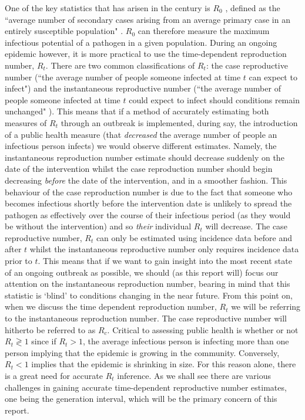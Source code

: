 \documentclass[10pt,journal,compsoc]{IEEEtran}
\begin{document}
One of the key statistics that has arisen in the  century is $R_0$ \cite{Heesterbeek}, defined as the ``average number of secondary cases arising from an average primary case in an entirely susceptible population" \cite{Keeling-Rohani}. $R_0$ can therefore measure the maximum infectious potential of a pathogen in a given population. During an ongoing epidemic however, it is more practical to use the time-dependent reproduction number, $R_t$. There are two common classifications of $R_t$: the case reproductive number (``the average number of people someone infected at time $t$ can expect to infect") and the instantaneous reproductive number (``the average number of people someone infected at time $t$ could expect to infect should conditions remain unchanged" \cite{Fraser}). This means that if a method of accurately estimating both measures of $R_t$ through an outbreak is implemented, during say, the introduction of a public health measure (that \textit{decreased} the average number of people an infectious person infects) we would observe different estimates. Namely, the instantaneous reproduction number estimate should decrease suddenly on the date of the intervention whilst the case reproduction number should begin decreasing \textit{before} the date of the intervention, and in a smoother fashion. This behaviour of the case reproduction number is due to the fact that someone who becomes infectious shortly before the intervention date is unlikely to spread the pathogen as effectively over the course of their infectious period (as they would be without the intervention) and so \textit{their} individual $R_t$ will decrease. The case reproductive number, $R_t$ can only be estimated using incidence data before and after $t$ whilst the instantaneous reproductive number only requires incidence data prior to $t$. This means that if we want to gain insight into the most recent state of an ongoing outbreak as possible, we should (as this report will) focus our attention on the instantaneous reproduction number, bearing in mind that this statistic is `blind' to conditions changing in the near future. From this point on, when we discuss the time dependent reproduction number, $R_t$ we will be referring to the instantaneous reproduction number. The case reproductive number will hitherto be referred to as $R_c$. Critical to assessing public health is whether or not $R_t \gtrless 1$ since if $R_t>1$, the average infectious person is infecting more than one person implying that the epidemic is growing in the community. Conversely, $R_t<1$ implies that the epidemic is shrinking in size. For this reason alone, there is a great need for accurate $R_t$ inference. As we shall see there are various challenges in gaining accurate time-dependent reproductive number estimates, one being the generation interval, which will be the primary concern of this report.\\
\end{document}
